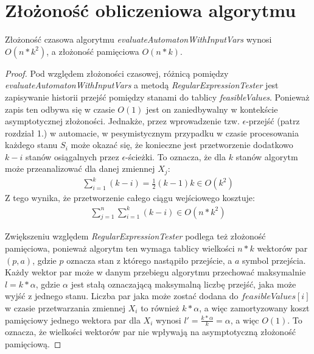 \section{Złożoność obliczeniowa algorytmu}
\begin{theorem}
Złożoność czasowa algorytmu \textit{evaluateAutomatonWithInputVars} wynosi $O(n*k^2)$, a złożoność pamięciowa $O(n*k)$.
\label{theory:evaluateAutomatonWithInputVars}
\end{theorem}
\begin{proof}
Pod względem złożoności czasowej, różnicą pomiędzy \textit{evaluateAutomatonWithInputVars} a metodą
\textit{RegularExpressionTester} jest zapisywanie historii przejść pomiędzy stanami do tablicy \textit{feasibleValues}.
Ponieważ zapis ten odbywa się w czasie $O(1)$ jest on zaniedbywalny w kontekście asymptotycznej złożoności.
Jednakże, przez wprowadzenie tzw. $\epsilon$-przejść (patrz rozdział 1.) w automacie, w pesymistycznym przypadku
w czasie procesowania każdego stanu $S_i$ może okazać się, że konieczne jest przetworzenie dodatkowo $k-i$
stanów osiągalnych przez $\epsilon$-ścieżki. To oznacza, że dla $k$ stanów algorytm może przeanalizować
dla danej zmiennej $X_j$:
\begin{equation}
	\begin{aligned}
		\sum_{i=1}^{k}{(k-i)} = \frac{1}{2}(k-1)k \in O(k^2)
	\end{aligned}
\end{equation}
Z tego wynika, że przetworzenie całego ciągu wejściowego kosztuje:
\begin{equation}
	\begin{aligned}
		\sum_{j=1}^{n}{\sum_{i=1}^{k}{(k-i)}} \in O(n*k^2)
	\end{aligned}
\end{equation}
\par
Zwiększeniu względem \textit{RegularExpressionTester} podlega też złożoność pamięciowa, ponieważ algorytm ten wymaga tablicy wielkości $n*k$ wektorów
par $(p, a)$, gdzie $p$ oznacza stan z którego nastąpiło przejście, a $a$ symbol przejścia. Każdy wektor par
może w danym przebiegu algorytmu przechować maksymalnie $l = k*\alpha$, gdzie $\alpha$ jest stałą oznaczającą maksymalną
liczbę przejść, jaka może wyjść z jednego stanu. Liczba par jaka może zostać dodana do $feasibleValues[i]$ w czasie
przetwarzania zmiennej $X_i$ to również $k*\alpha$, a więc zamortyzowany koszt pamięciowy jednego wektora par dla $X_i$
wynosi $l' = \frac{k*\alpha}{k} = \alpha$, a więc $O(1)$. To oznacza, że wielkości wektorów par nie wpływają na asymptotyczną
złożoność pamięciową.
\end{proof}
